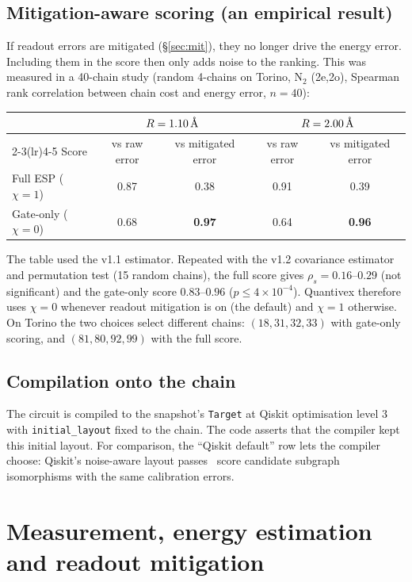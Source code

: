 \documentclass[10pt,a4paper]{article}
\newcommand{\Ang}{\ensuremath{\,\text{\normalfont\AA}}}
\newcommand{\code}[1]{\texttt{\small #1}}
\begin{document}
\subsection{Mitigation-aware scoring (an empirical result)}
If readout errors are mitigated (\S\ref{sec:mit}), they no longer drive the energy error. Including them in the score then only adds noise to the ranking. This was measured in a 40-chain study (random 4-chains on Torino, N$_2$ (2e,2o), Spearman rank correlation between chain cost and energy error, $n=40$):
\begin{center}\small
\begin{tabular}{@{}lcccc@{}}\toprule
 & \multicolumn{2}{c}{$R=1.10\Ang$} & \multicolumn{2}{c}{$R=2.00\Ang$}\\\cmidrule(lr){2-3}\cmidrule(lr){4-5}
Score & vs raw error & vs mitigated error & vs raw error & vs mitigated error\\\midrule
Full ESP ($\chi=1$) & 0.87 & 0.38 & 0.91 & 0.39\\
Gate-only ($\chi=0$) & 0.68 & \textbf{0.97} & 0.64 & \textbf{0.96}\\\bottomrule
\end{tabular}
\end{center}
The table used the v1.1 estimator. Repeated with the v1.2 covariance estimator and permutation test (15 random chains), the full score gives $\rho_s=0.16$--$0.29$ (not significant) and the gate-only score $0.83$--$0.96$ ($p\le4\times10^{-4}$). Quantivex therefore uses $\chi=0$ whenever readout mitigation is on (the default) and $\chi=1$ otherwise. On Torino the two choices select different chains: $(18,31,32,33)$ with gate-only scoring, and $(81,80,92,99)$ with the full score.

\subsection{Compilation onto the chain}
The circuit is compiled to the snapshot's \code{Target} at Qiskit optimisation level 3 with \code{initial\_layout} fixed to the chain. The code asserts that the compiler kept this initial layout. For comparison, the ``Qiskit default'' row lets the compiler choose: Qiskit's noise-aware layout passes~\cite{Qiskit2024,Nation2023} score candidate subgraph isomorphisms with the same calibration errors.

\section{Measurement, energy estimation and readout mitigation}\label{sec:meas}
\end{document}
